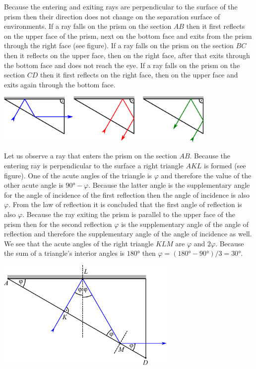 \documentclass[11pt]{article}
\begin{document}
\solueng
\osa Because the entering and exiting rays are perpendicular to the surface of the prism then their direction does not change on the separation surface of environments. If a ray falls on the prism on the section $AB$ then it first reflects on the upper face of the prism, next on the bottom face and exits from the prism through the right face (see figure). If a ray falls on the prism on the section $BC$ then it reflects on the upper face, then on the right face, after that exits through the bottom face and does not reach the eye. If a ray falls on the prism on the section $CD$ then it first reflects on the right face, then on the upper face and exits again through the bottom face. 
\begin{center}
  \includegraphics[width=0.8\textwidth]{2014-v3g-04-periskoopprillid_lahendus_joonis1}
\end{center}
\osa Let us observe a ray that enters the prism on the section $AB$. Because the entering ray is perpendicular to the surface a right triangle $AKL$ is formed (see figure). One of the acute angles of the triangle is $\varphi$ and therefore the value of the other acute angle is $\ang{90}-\varphi$. Because the latter angle is the supplementary angle for the angle of incidence of the first reflection then the angle of incidence is also $\varphi$. From the law of reflection it is concluded that the first angle of reflection is also $\varphi$. Because the ray exiting the prism is parallel to the upper face of the prism then for the second reflection $\varphi$ is the supplementary angle of the angle of reflection and therefore the supplementary angle of the angle of incidence as well. We see that the acute angles of the right triangle $KLM$ are $\varphi$ and $2\varphi$. Because the sum of a triangle’s interior angles is $\ang{180}$ then $\varphi=(\ang{180}-\ang{90})/3=\ang{30}$.
\begin{center}
  \includegraphics[width=0.65\textwidth]{2014-v3g-04-periskoopprillid_lahendus_joonis2}
\end{center}
\end{document}
